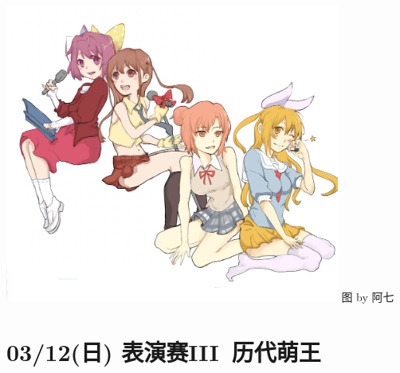 
\begin{center}
{\includegraphics[width=11cm]{images/best4.jpg}}
\tiny\kai 图 by 阿七
\end{center}

\newpage
\section{03/12(日) 表演赛III~历代萌王}

